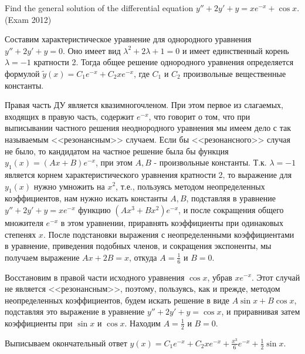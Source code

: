 \begin{problem}
Find the general solution of the differential equation $y''+2y'+y=xe^{-x} +\cos x$. (Exam 2012)


\begin{sol}
Составим характеристическое уравнение для однородного уравнения $y''+2y'+y=0$. Оно имеет вид $\lambda ^{2} +2\lambda +1=0$ и имеет единственный корень $\lambda =-1$ кратности 2. Тогда общее решение однородного уравнения определяется формулой $\tilde{y}(x)=C_{1} e^{-x} +C_{2} xe^{-x} $, где $C_{1} $ и $C_{2} $ произвольные вещественные константы.

Правая часть ДУ является квазимногочленом. При этом первое из слагаемых, входящих в правую часть, содержит $e^{-x} $, что говорит о том, что при выписывании частного решения неоднородного уравнения мы имеем дело с так называемым <<резонансным>> случаем. Если бы <<резонансного>> случая не было, то кандидатом на частное решение была бы функция $y_{1} (x)=(Ax+B)e^{-x} $, при этом $A, B$ - произвольные константы. Т.к. $\lambda =-1$ является корнем характеристического уравнения кратности 2, то выражение для $y_{1} (x)$ нужно умножить на $x^{2} $, т.е., пользуясь методом неопределенных коэффициентов, нам нужно искать константы $A, B$, подставляя в уравнение $y''+2y'+y=xe^{-x} $ функцию $(Ax^{3} +Bx^{2} )e^{-x} $, и после сокращения общего множителя $e^{-x} $ в этом уравнении, приравнять коэффициенты при одинаковых степенях $x$. После подстановки выражения с неопределенными коэффициентами в уравнение, приведения подобных членов, и сокращения экспоненты, мы получаем выражение $Ax+2B=x$, откуда $A=\frac{1}{6} $ и $B=0$.


Восстановим в правой части исходного уравнения $\cos x$, убрав $xe^{-x} $. Этот случай не является <<резонансным>>, поэтому, пользуясь, как и прежде, методом неопределенных коэффициентов, будем искать решение в виде $A\sin x+B\cos x$, подставляя это выражение в уравнение $y''+2y'+y=\cos x$, и приравнивая затем коэффициенты при $\sin x$ и $\cos x$. Находим $A=\frac{1}{2} $ и $B=0$.

Выписываем окончательный ответ $y(x)=C_{1} e^{-x} +C_{2} xe^{-x} +\frac{x^{3} }{6} e^{-x} +\frac{1}{2} \sin x$.
\end{sol}
\end{problem}

